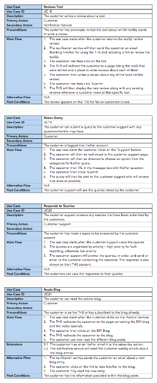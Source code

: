 \documentclass[fontsize=11pt]{extarticle}
\numberwithin{figure}{section} %
\numberwithin{table}{section}%
\begin{document}
\begin{figure}[H]
      \centering
      \includegraphics[trim = 0 0 0 0, clip, width=0.7\textwidth]{TempImg/UC18.png}
 \end{figure}

\begin{figure}[H]
      \centering
      \includegraphics[trim = 0 0 0 0, clip, width=0.7\textwidth]{TempImg/UC19.png}
 \end{figure}

\begin{figure}[H]
      \centering
      \includegraphics[trim = 0 0 0 0, clip, width=0.7\textwidth]{TempImg/UC20.png}
 \end{figure}

\begin{figure}[H]
      \centering
      \includegraphics[trim = 0 0 0 0, clip, width=0.7\textwidth]{TempImg/UC21.png}
 \end{figure}
\end{document}
